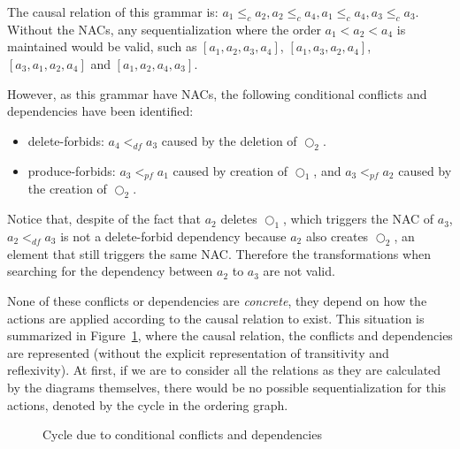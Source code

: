 \begin{example}
  The causal relation of this grammar is: $a_1 \leq_c a_2, a_2 \leq_c a_4, a_1 \leq_c a_4, a_3 \leq_c a_3$. Without the NACs, any sequentialization where the order $a_1 < a_2 < a_4$ is maintained would be valid, such as $[a_1, a_2, a_3, a_4]$, $[a_1,a_3,a_2,a_4]$, $[a_3, a_1, a_2, a_4]$ and $[a_1,a_2,a_4,a_3]$.

  However, as this grammar have NACs, the following conditional conflicts and dependencies have been identified:
\begin{itemize}
  \item delete-forbids: $a_4 <_{df} a_3$ caused by the deletion of $\Circle_2$.
  \item produce-forbids: $a_3 <_{pf} a_1$ caused by creation of $\Circle_1$, and $a_3 <_{pf} a_2$ caused by the creation of $\Circle_2$.
\end{itemize}

  Notice that, despite of the fact that $a_2$ deletes $\Circle_1$, which triggers the NAC of $a_3$, $a_2 <_{df} a_3$ is not a delete-forbid dependency because $a_2$ also creates $\Circle_2$, an element that still triggers the same NAC. Therefore the transformations when searching for the dependency between $a_2$ to $a_3$ are not valid.

  None of these conflicts or dependencies are \emph{concrete}, they depend on how the actions are applied according to the causal relation to exist. This situation is summarized in Figure~\ref{fig:process:order:cycle}, where the causal relation, the conflicts and dependencies are represented (without the explicit representation of transitivity and reflexivity). At first, if we are to consider all the relations as they are calculated by the diagrams themselves, there would be no possible sequentialization for this actions, denoted by the cycle in the ordering graph.

\begin{figure}[!ht]
  \centering
  \caption{Cycle due to conditional conflicts and dependencies}\label{fig:process:order:cycle}
\end{figure}


\end{example}
